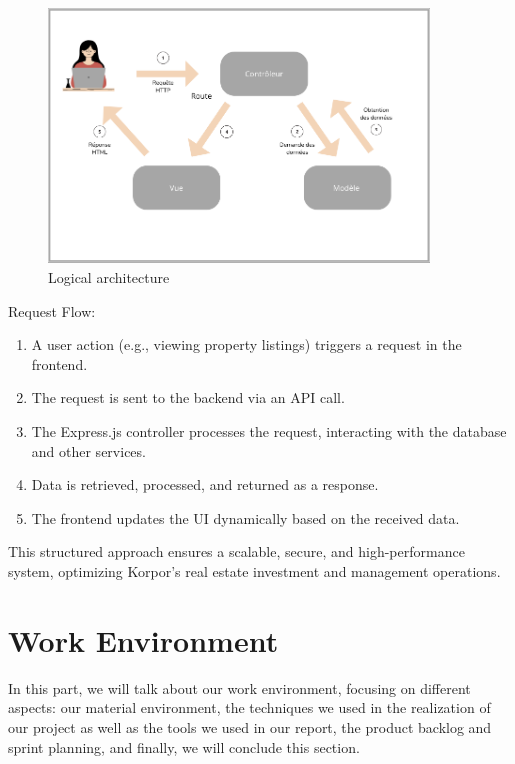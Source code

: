 \begin{figure}[htbp]
    \centering
    \includegraphics[width=0.9\textwidth]{images/logique.png}
    \caption{Logical architecture}
    \label{fig:logical-architecture}
\end{figure}

Request Flow:
\begin{enumerate}
    \item A user action (e.g., viewing property listings) triggers a request in the frontend.
    \item The request is sent to the backend via an API call.
    \item The Express.js controller processes the request, interacting with the database and other services.
    \item Data is retrieved, processed, and returned as a response.
    \item The frontend updates the UI dynamically based on the received data.
\end{enumerate}

This structured approach ensures a scalable, secure, and high-performance system, optimizing Korpor's real estate investment and management operations.

\section{Work Environment}

In this part, we will talk about our work environment, focusing on different aspects:
our material environment, the techniques we used in the realization of our project as well as the tools we used in our report, the product backlog and sprint planning, and finally, we will conclude this section.


